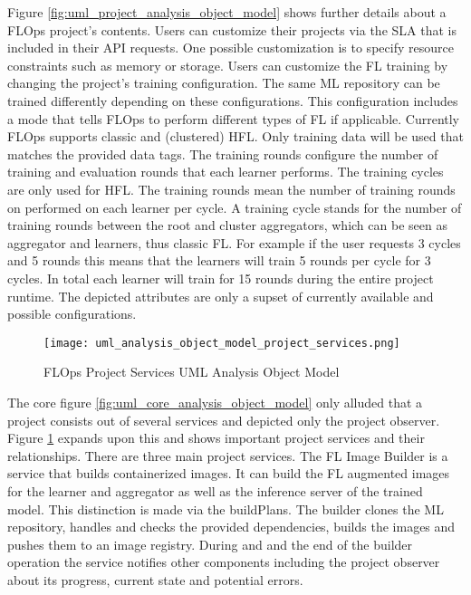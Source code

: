 Figure \ref{fig:uml_project_analysis_object_model} shows further details about a FLOps project's contents.
Users can customize their projects via the SLA that is included in their API requests.
One possible customization is to specify resource constraints such as memory or storage.
Users can customize the FL training by changing the project's training configuration.
The same ML repository can be trained differently depending on these configurations.
This configuration includes a mode that tells FLOps to perform different types of FL if applicable.
Currently FLOps supports classic and (clustered) HFL.
Only training data will be used that matches the provided data tags.
The training rounds configure the number of training and evaluation rounds that each learner performs.
The training cycles are only used for HFL.
The training rounds mean the number of training rounds on performed on each learner per cycle.
A training cycle stands for the number of training rounds between the root and cluster aggregators, which can be seen as aggregator and learners, thus classic FL.
For example if the user requests 3 cycles and 5 rounds this means that the learners will train 5 rounds per cycle for 3 cycles.
In total each learner will train for 15 rounds during the entire project runtime.
The depicted attributes are only a supset of currently available and possible configurations.

\begin{figure}[h]
    \centering
    \texttt{[image: uml\_analysis\_object\_model\_project\_services.png]}
    \caption{FLOps Project Services UML Analysis Object Model}
    \label{fig:uml_project_services_analysis_object_model}
\end{figure}

The core figure \ref{fig:uml_core_analysis_object_model} only alluded that a project consists out of several services and depicted only the project observer.
Figure \ref{fig:uml_project_services_analysis_object_model} expands upon this and shows important project services and their relationships.
There are three main project services.
The FL Image Builder is a service that builds containerized images.
It can build the FL augmented images for the learner and aggregator as well as the inference server of the trained model.
This distinction is made via the buildPlans.
The builder clones the ML repository, handles and checks the provided dependencies, builds the images and pushes them to an image registry.
During and and the end of the builder operation the service notifies other components including the project observer about its progress, current state and potential errors.


